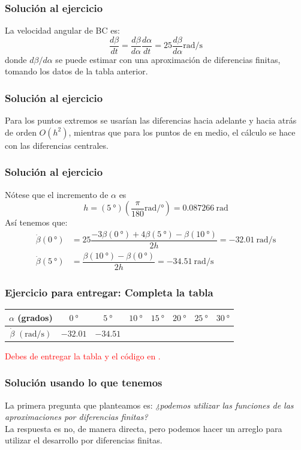 \begin{frame}
\frametitle{Solución al ejercicio}
La velocidad angular de BC es:
\[ \dfrac{d\beta}{dt} = \dfrac{d\beta}{d\alpha}\dfrac{d\alpha}{dt} = 25\dfrac{d\beta}{d\alpha} \si{\radian\per\second}\]
donde $d\beta/d\alpha$ se puede estimar con una aproximación de diferencias finitas, tomando los datos de la tabla anterior.
\end{frame}
\begin{frame}
\frametitle{Solución al ejercicio}
Para los puntos extremos se usarían las diferencias hacia adelante y hacia atrás de orden $O(h^{2})$, mientras que para los puntos de en medio, el cálculo se hace con las diferencias centrales.
\end{frame}
\begin{frame}
\frametitle{Solución al ejercicio}
Nótese que el incremento de $\alpha$ es
\[h = (\SI{5}{\degree}) \left( \frac{\pi}{180} \si{\radian} / \si{\degree} \right) = \SI{0.087266}{\radian}\]
Así tenemos que:
\fontsize{12}{12}\selectfont
\begin{align*}
\dot{\beta}(\SI{0}{\degree}) &=  25 \dfrac{-3 \beta(\SI{0}{\degree})+ 4 \beta(\SI{5}{\degree})-\beta(\SI{10}{\degree})}{2h} = -\SI{32.01}{\radian\per\second} \\
\dot{\beta}(\SI{5}{\degree}) &= \dfrac{\beta(\SI{10}{\degree})- \beta(\SI{0}{\degree})}{2h} = -\SI{34.51}{\radian\per\second}
\end{align*}
\end{frame}
\begin{frame}
\frametitle{Ejercicio para entregar: Completa la tabla}
\begin{center}
\fontsize{12}{12}\selectfont
\begin{tabular}{c | c | c | c | c | c | c | c}
$\alpha$ (grados) & $\SI{0}{\degree}$ & $\SI{5}{\degree}$ & $\SI{10}{\degree}$ & $\SI{15}{\degree}$ & $\SI{20}{\degree}$ & $\SI{25}{\degree}$ & $\SI{30}{\degree}$  \\ \hline
$\dot{\beta}$ $(\si{\radian\per\second})$ & $-32.01$ & $-34.51$ &  &  &  &  & 
\end{tabular}
\end{center}
\textcolor{red}{Debes de entregar la tabla y el código en \python.}
\end{frame}
\begin{frame}
\frametitle{Solución usando lo que tenemos}
La primera pregunta que planteamos es: \emph{¿podemos utilizar las funciones de las aproximaciones por diferencias finitas?}
\\
\bigskip
\pause
La respuesta es no, de manera directa, pero podemos hacer un arreglo para utilizar el desarrollo por diferencias finitas.
\end{frame}
